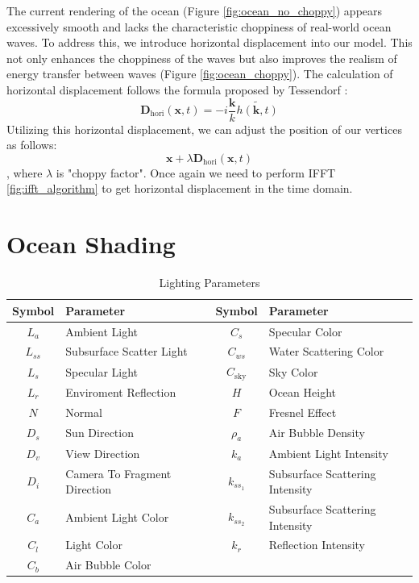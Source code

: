 The current rendering of the ocean (Figure \ref{fig:ocean_no_choppy}) appears excessively smooth and lacks the characteristic choppiness of real-world ocean waves. To address this, we introduce horizontal displacement into our model. This not only enhances the choppiness of the waves but also improves the realism of energy transfer between waves (Figure \ref{fig:ocean_choppy}).
The calculation of horizontal displacement follows the formula proposed by Tessendorf \cite{tessendorf2004}:
\begin{equation}
    \mathbf{D}_{\text{hori}}(\textbf{x}, t) = -i\frac{\mathbf{k}}{k}\tilde{h(\mathbf{k}, t)}
\end{equation}
Utilizing this horizontal displacement, we can adjust the position of our vertices as follows:
\begin{equation}
    \mathbf{x} + \lambda \mathbf{D}_{\text{hori}}(\textbf{x}, t)
\end{equation}
, where $\lambda$ is "choppy factor".
Once again we need to perform IFFT \ref{fig:ifft_algorithm} to get horizontal displacement in the time domain.

\section{Ocean Shading}

\begin{table}[H]
    \centering
    \begin{tabular}{cl|cl}
        \toprule
        \textbf{Symbol} & \textbf{Parameter} & \textbf{Symbol} & \textbf{Parameter} \\
        \midrule
        $L_a$ & Ambient Light & $C_{s}$ & Specular Color \\
        $L_{ss}$ & Subsurface Scatter Light & $C_{ws}$ & Water Scattering Color \\
        $L_s$ & Specular Light & $C_{\text{sky}}$ & Sky Color \\
        $L_r$ & Enviroment Reflection & $H$ & Ocean Height \\
        $N$ & Normal & $F$ & Fresnel Effect \\
        $D_s$ & Sun Direction & $\rho_a$ & Air Bubble Density \\
        $D_v$ & View Direction & $k_a$ & Ambient Light Intensity \\
        $D_i$ & Camera To Fragment Direction & $k_{ss_1}$ & Subsurface Scattering Intensity \\
        $C_a$ & Ambient Light Color & $k_{ss_2}$ & Subsurface Scattering Intensity \\
        $C_l$ & Light Color & $k_{r}$ & Reflection Intensity \\
        $C_b$ & Air Bubble Color & & \\
        \bottomrule
    \end{tabular}
    \caption{Lighting Parameters}
    \label{table:lighting_parameters}
\end{table}

